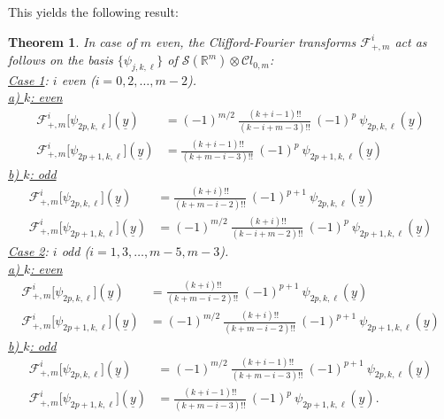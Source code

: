 \documentclass{amsart}
\newtheorem{theorem}{Theorem}[section]
\theoremstyle{remark}
\begin{document}
This yields the following result:
\begin{theorem}
\label{EigValsEven}
In case of $m$ even, the Clifford-Fourier transforms $\mathcal{F}^{i}_{+,m}$ act as follows on the basis $\lbrace \psi_{j,k,\ell} \rbrace$ of ${\mathcal S}(\mathbb{R}^m) \otimes {\mathcal{C}} l_{0,m}$:\vspace{0,2cm}\\
\emph{\underline{Case 1}: $i$ even} ($i=0,2,\ldots,m-2$).\vspace{0,1cm}\\
\underline{a) $k$: even}
\begin{align*}
\mathcal{F}^{i}_{+,m} \lbrack \psi_{2p,k,\ell} \rbrack ({\underline{y}}) &= (-1)^{m/2} \ \frac{(k+i-1)!!}{(k-i+m-3)!!} \ (-1)^p \ \psi_{2p,k,\ell}({\underline{y}})\\
\mathcal{F}^{i}_{+,m} \lbrack \psi_{2p+1,k,\ell} \rbrack ({\underline{y}}) &=   \frac{(k+i-1)!!}{(k+m-i-3)!!} \ (-1)^p \ \psi_{2p+1,k,\ell}({\underline{y}})
\end{align*}
\underline{b) $k$: odd}
\begin{align*}
\mathcal{F}^{i}_{+,m} \lbrack \psi_{2p,k,\ell} \rbrack ({\underline{y}}) &=    \frac{(k+i)!!}{(k+m-i-2)!!} \ (-1)^{p+1} \ \psi_{2p,k,\ell}({\underline{y}})\\
\mathcal{F}^{i}_{+,m} \lbrack \psi_{2p+1,k,\ell} \rbrack ({\underline{y}}) &=  (-1)^{m/2} \  \frac{(k+i)!!}{(k-i+m-2)!!} \ (-1)^p \ \psi_{2p+1,k,\ell}({\underline{y}})
\end{align*}
\emph{\underline{Case 2}: $i$ odd} ($i=1,3,\ldots,m-5,m-3$).\vspace{0,1cm}\\
\underline{a) $k$: even}
\begin{align*}
\mathcal{F}^{i}_{+,m} \lbrack \psi_{2p,k,\ell} \rbrack ({\underline{y}}) &=   \frac{(k+i)!!}{(k+m-i-2)!!} \ (-1)^{p+1} \ \psi_{2p,k,\ell}({\underline{y}})\\
\mathcal{F}^{i}_{+,m} \lbrack \psi_{2p+1,k,\ell} \rbrack ({\underline{y}}) &=  (-1)^{m/2} \  \frac{(k+i)!!}{(k+m-i-2)!!} \ (-1)^{p+1} \ \psi_{2p+1,k,\ell}({\underline{y}})
\end{align*}
\underline{b) $k$: odd}
\begin{align*}
\mathcal{F}^{i}_{+,m} \lbrack \psi_{2p,k,\ell} \rbrack ({\underline{y}}) &=   (-1)^{m/2} \ \frac{(k+i-1)!!}{(k+m-i-3)!!} \ (-1)^{p+1} \ \psi_{2p,k,\ell}({\underline{y}})\\
\mathcal{F}^{i}_{+,m} \lbrack \psi_{2p+1,k,\ell} \rbrack ({\underline{y}}) &=   \frac{(k+i-1)!!}{(k+m-i-3)!!} \ (-1)^p \ \psi_{2p+1,k,\ell}({\underline{y}}).
\end{align*}
\end{theorem}
\end{document}
